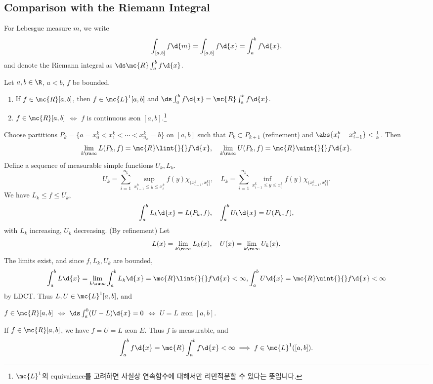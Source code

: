 \bigskip

\subsection*{Comparison with the Riemann Integral}

For Lebesgue measure \(m\), we write
\[
    \int_{[a, b]} f \d{m} = \int_{[a, b]} f \d{x} = \int_a^b f \d{x},
\]
and denote the Riemann integral as \(\ds \mc{R}\int_a^b f\d{x}\).

 Let \(a, b \in \R\), \(a < b\), \(f\) be bounded.
\begin{enumerate}
    \item If \(f \in \mc{R}[a, b]\), then \(f \in \mc{L}^{1}[a, b]\) and \(\ds \int_a^b f\d{x} = \mc{R}\int_a^b f \d{x}\).
    \item \(f \in \mc{R}[a, b]\) \(\iff\) \(f\) is continuous \ae on \([a, b]\).\footnote{\(\mc{L}^{1}\)의 equivalence를 고려하면 사실상 연속함수에 대해서만 리만적분할 수 있다는 뜻입니다.}
\end{enumerate}

\pf Choose partitions \(P_k = \{a = x_0^k < x_1^k < \cdots < x_{n_k}^k = b\}\) on \([a, b]\) such that \(P_k \subset P_{k+1}\) (refinement) and \(\abs{x_{i}^k - x_{i-1}^k} < \frac{1}{k}\). Then
\[
    \lim_{k \ra \infty} L(P_k, f) = \mc{R}\lint{}{} f\d{x}, \quad \lim_{k \ra \infty} U(P_k, f) = \mc{R} \uint{}{} f \d{x}.
\]
Define a sequence of measurable simple functions \(U_k, L_k\).
\[
    U_k = \sum_{i=1}^{n_k} \sup_{x_{i-1}^k \leq y \leq x_{i}^k} f(y) \chi_{(x_{i-1}^k, x_i^k]}, \quad L_k = \sum_{i=1}^{n_k} \inf_{x_{i-1}^k \leq y \leq x_{i}^k} f(y) \chi_{(x_{i-1}^k, x_i^k]}.
\]
We have \(L_k \leq f \leq U_k\),
\[
    \int_a^b L_k \d{x} = L(P_k, f), \quad \int_a^b U_k \d{x} = U(P_k, f),
\]
with \(L_k\) increasing, \(U_k\) decreasing. (By refinement) Let
\[
    L(x) = \lim_{k \ra \infty} L_k(x), \quad U(x) = \lim_{k \ra \infty} U_k(x).
\]
The limits exist, and since \(f, L_k, U_k\) are bounded,
\[
    \int_a^b L \d{x} = \lim_{k \ra \infty} \int_a^b L_k \d{x} = \mc{R}\lint{}{} f\d{x} < \infty, \int_a^b U\d{x} = \mc{R} \uint{}{} f \d{x} < \infty
\]
by LDCT. Thus \(L, U \in \mc{L}^{1}[a, b]\), and
\begin{center}
    \(f \in \mc{R}[a, b]\) \(\iff\) \(\ds \int_a^b (U - L)\d{x} = 0\) \(\iff\) \(U = L\) \ae on \([a, b]\).
\end{center}

 If \(f \in \mc{R}[a, b]\), we have \(f = U = L\) \ae on \(E\). Thus \(f\) is measurable, and
\[
    \int_a^b f \d{x} = \mc{R}\int_a^b f\d{x} < \infty \implies f \in \mc{L}^{1}([a, b]).
\]

